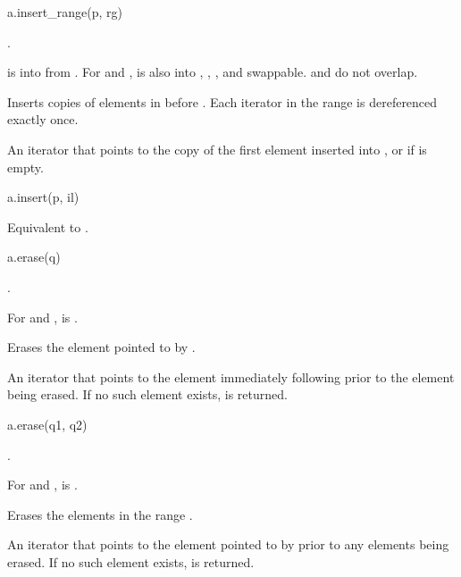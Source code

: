 %
\begin{itemdecl}
a.insert_range(p, rg)
\end{itemdecl}

\begin{itemdescr}
\pnum
\result
{}.

\pnum
\expects
{} is  into 
from .
For  and ,
 is also
 into ,
,
, and
swappable.
 and  do not overlap.

\pnum
\effects
Inserts copies of elements in  before .
Each iterator in the range  is dereferenced exactly once.

\pnum
\returns
An iterator
that points to the copy of the first element inserted into , or
 if  is empty.
\end{itemdescr}

\begin{itemdecl}
a.insert(p, il)
\end{itemdecl}

\begin{itemdescr}
\pnum
\effects
Equivalent to .
\end{itemdescr}

%
\begin{itemdecl}
a.erase(q)
\end{itemdecl}

\begin{itemdescr}
\pnum
\result
{}.

\pnum
\expects
For  and ,
 is .

\pnum
\effects
Erases the element pointed to by .

\pnum
\returns
An iterator that points to the element immediately following 
prior to the element being erased.
If no such element exists,  is returned.
\end{itemdescr}

\begin{itemdecl}
a.erase(q1, q2)
\end{itemdecl}

\begin{itemdescr}
\pnum
\result
{}.

\pnum
\expects
For  and ,  is .

\pnum
\effects
Erases the elements in the range \tcode{[q1, q2)}.

\pnum
\returns
An iterator that points to the element pointed to by 
prior to any elements being erased.
If no such element exists,  is returned.
\end{itemdescr}

